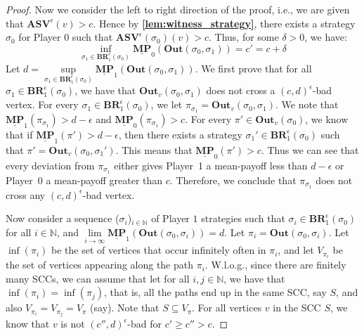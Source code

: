 \begin{proof}
Now we consider the left to right direction of the proof, i.e., we are given that $\mathbf{ASV}^{\epsilon}(v) > c$. 
Hence by \textbf{\cref{lem:witness_strategy}}, there exists a strategy $\sigma_0$ for Player $0$ such that $\mathbf{ASV}^{\epsilon}(\sigma_0)(v) > c$. Thus, for some $\delta > 0$, we have:
\begin{equation*}
    \inf\limits_{\sigma_1 \in \mathbf{BR}_1^{\epsilon}(\sigma_0)} \underline{\mathbf{MP}}_0(\mathbf{Out}(\sigma_0, \sigma_1)) = c' = c + \delta
\end{equation*}
Let $d = \sup\limits_{\sigma_1 \in \mathbf{BR}_1^{\epsilon}(\sigma_0)} \underline{\mathbf{MP}}_1(\mathbf{Out}(\sigma_0, \sigma_1))$. We first prove that for all $\sigma_1 \in \mathbf{BR}_1^{\epsilon}(\sigma_0)$, we have that $\mathbf{Out}_v(\sigma_0, \sigma_1)$ does not cross a $(c,d)^{\epsilon}$-bad vertex. For every $\sigma_1 \in \mathbf{BR}_1^{\epsilon}(\sigma_0)$, we let $\pi_{\sigma_1} = \mathbf{Out}_v(\sigma_0, \sigma_1)$. We note that $\underline{\mathbf{MP}}_1(\pi_{\sigma_1}) > d -\epsilon$ and $\underline{\mathbf{MP}}_0(\pi_{\sigma_1}) > c$. For every $\pi' \in \mathbf{Out}_v(\sigma_0)$, we know that if $\underline{\mathbf{MP}}_1(\pi') > d - \epsilon$, then there exists a strategy $\sigma_1' \in \mathbf{BR}_1^{\epsilon}(\sigma_0)$ such that $\pi' = \mathbf{Out}_v(\sigma_0, \sigma_1')$. This means that $\underline{\mathbf{MP}}_0(\pi') > c$. Thus we can see that every deviation from $\pi_{\sigma_1}$ either gives Player~1 a mean-payoff less than $d - \epsilon$ or Player~0 a mean-payoff greater than $c$. Therefore, we conclude that $\pi_{\sigma_1}$ does not cross any $(c,d)^{\epsilon}$-bad vertex. 

Now consider a sequence ($\sigma_i$)$_{i \in \mathbb{N}}$ of Player $1$ strategies such that $\sigma_i \in \mathbf{BR}_1^{\epsilon}(\sigma_0)$ for all $i \in \mathbb{N}$, and $\lim \limits_{i \to \infty} \underline{\mathbf{MP}}_1(\mathbf{Out}(\sigma_0, \sigma_i))=d$. Let $\pi_i = \mathbf{Out}(\sigma_0, \sigma_i)$.
Let $\inf(\pi_i)$ be the set of vertices that occur infinitely often in $\pi_i$, and let $V_{\pi_i}$ be the set of vertices appearing along the path $\pi_i$.
W.l.o.g., since there are finitely many SCCs, we can assume that let for all $i, j \in \mathbb{N}$, we have that $\inf(\pi_i) = \inf(\pi_j)$, that is, all the paths end up in the same SCC, say $S$, and also $V_{\pi_i} = V_{\pi_j}=V_{\pi}$ (say). 
Note that $S \subseteq V_{\pi}$.
For all vertices $v$ in the SCC $S$, we know that $v$ is not $(c'',d)^{\epsilon}$-bad for $c'\geqslant c''> c$.


\end{proof}
